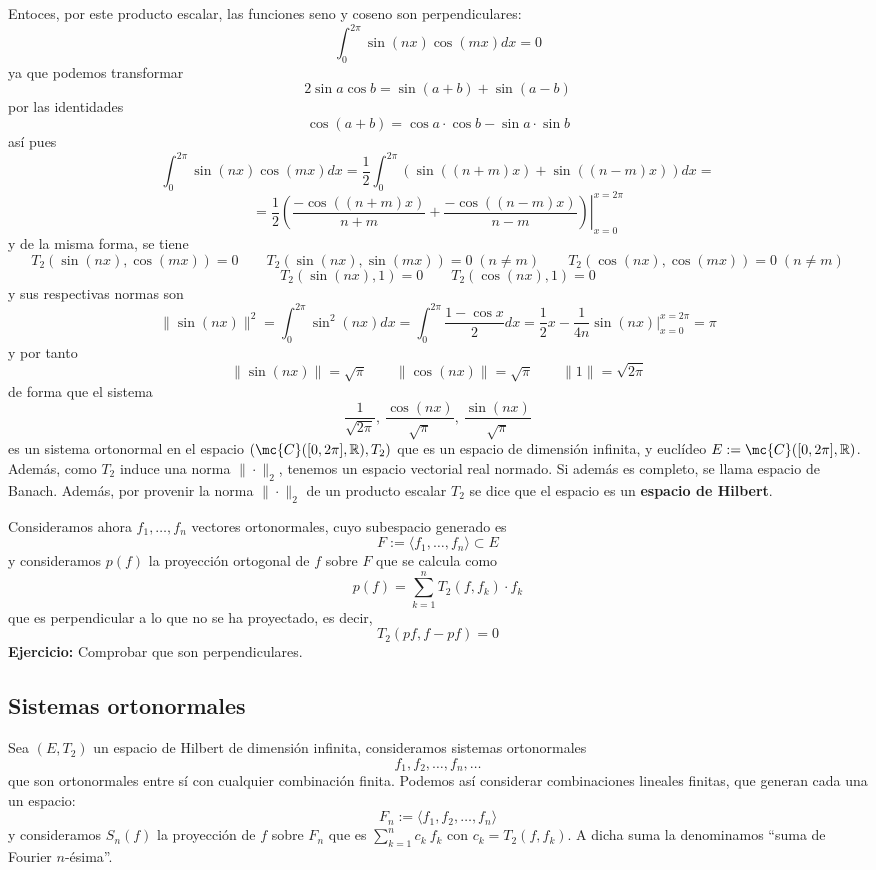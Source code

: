 \begin{eje}
    Entoces, por este producto escalar, las funciones seno y coseno son perpendiculares:
    $$\int_0^{2 \pi} \sin(nx) \cos(mx) dx = 0 $$
    ya que podemos transformar
    $$2\sin a \cos b= \sin(a+b) + \sin(a-b)$$
    por las identidades
    $$\cos(a+b)=\cos a \cdot \cos b - \sin a \cdot \sin b $$
    así pues
    $$\int_0^{2 \pi} \sin(nx) \cos(mx) dx = \dfrac{1}{2}\int_0^{2 \pi} (\sin((n+m)x)+ \sin((n-m)x)) dx=$$
    $$=\left.\dfrac{1}{2}\left(\dfrac{-\cos((n+m)x)}{n+m}+\dfrac{-\cos((n-m)x)}{n-m} \right) \right|_{x=0}^{x=2\pi}$$
    y de la misma forma, se tiene
    $$T_2( \sin(nx), \cos(mx) )=0 \qquad T_2( \sin(nx), \sin(mx) )=0 \; (n \neq m ) \qquad T_2( \cos(nx), \cos(mx) )=0 \; (n \neq m )$$
    $$T_2( \sin(nx),1 )=0 \qquad T_2( \cos(nx),1 )=0$$
    y sus respectivas normas son
    $$\|\sin(nx)\|^2=\int_0^{2 \pi} \sin^2(nx) dx= \int_0^{2 \pi} \dfrac{1-\cos x}{2}dx = \dfrac{1}{2}x-\dfrac{1}{4n}\sin(nx) \Big|_{x=0}^{x=2\pi}=\pi$$
    y por tanto
    $$\|\sin(nx)\|=\sqrt{\pi} \qquad \|\cos(nx)\|=\sqrt{\pi} \qquad \|1\|=\sqrt{2\pi}  $$
    de forma que el sistema
    $$\dfrac{1}{\sqrt{2\pi}},\: \dfrac{\cos(nx)}{\sqrt{\pi}},\: \dfrac{\sin(nx)}{\sqrt{\pi}} $$
    es un sistema ortonormal en el espacio $\left(\mc{C}([0,2\pi],\mathbb R),T_2\right)$ que es un espacio de dimensión infinita, y euclídeo $E:=\mc{C}([0,2\pi],\mathbb R)$. Además, como $T_2$ induce una norma $\|\cdot\|_2$, tenemos un espacio vectorial real normado. Si además es completo, se llama espacio de Banach. Además, por provenir la norma $\|\cdot \|_2$ de un producto escalar $T_2$ se dice que el espacio es un \textbf{espacio de Hilbert}.

    Consideramos ahora $f_1, \ldots, f_n$ vectores ortonormales, cuyo subespacio generado es
    $$F:=\langle f_1, \ldots, f_n \rangle \subset E$$
    y consideramos $p(f)$ la proyección ortogonal de $f$ sobre $F$ que se calcula como 
    $$p(f)=\sum_{k=1}^n T_2(f,f_k)\cdot f_k$$
     que es perpendicular a lo que no se ha proyectado, es decir, 
     $$T_2(pf,f-pf)= 0$$
     \textbf{Ejercicio:} Comprobar que son perpendiculares.
    \end{eje}
    \subsection{Sistemas ortonormales}
    Sea $(E,T_2)$ un espacio de Hilbert de dimensión infinita, consideramos sistemas ortonormales
    $$f_1, f_2, \ldots, f_n , \ldots$$
    que son ortonormales entre sí con cualquier combinación finita. Podemos así considerar combinaciones lineales finitas, que generan cada una un espacio:
    $$F_n:=\langle f_1, f_2, \ldots, f_n  \rangle$$
    y consideramos $S_n(f)$ la proyección de $f$ sobre $F_n$ que es $\displaystyle \sum_{k=1}^{n} c_k \: f_k$ con $c_k=T_2(f,f_k)$. A dicha suma la denominamos ``suma de Fourier $n$-ésima''.


